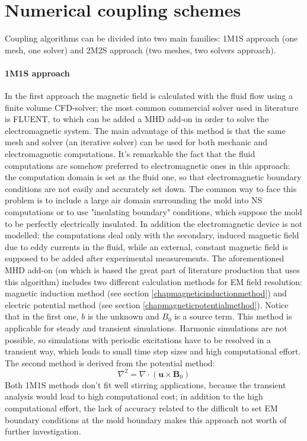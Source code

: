 \section{Numerical coupling schemes}
\label{chapnumericalschemes}
Coupling algorithms can be divided into two main families: 1M1S approach  (one mesh, one solver) and 2M2S approach (two meshes, two solvers approach).\\
\paragraph{1M1S approach}
In the first approach the magnetic field is calculated with the fluid flow using a finite volume CFD-solver; the most common commercial solver used in literature is FLUENT, to which can be added a MHD add-on in order to solve the electromagnetic system. The main advantage of this method is that the same mesh and solver (an iterative solver) can be used for both mechanic and electromagnetic computations. It's remarkable the fact that the fluid computations are somehow preferred to electromagnetic ones in this approach: the computation domain is set as the fluid one, so that electromagnetic boundary conditions are not easily and accurately set down. The common way to face this problem is to include a large air domain surrounding the mold into NS computations or to use  "insulating boundary" conditions, which suppose the mold to be perfectly electrically insulated. In addition the electromagnetic device is not modelled: the computations deal only with the secondary, induced magnetic field due to eddy currents in the fluid, while an external, constant magnetic field is supposed to be added after experimental measurements. The aforementioned MHD add-on (on which is based the great part of literature production that uses this algorithm) includes two different calculation methods for EM field resolution: magnetic induction method (see section \ref{chapmagneticinductionmethod}) and electric potential method (see section \ref{chapmagneticpotentialmethod}). Notice that in the first one, $b$ is the unknown and $B_0$ is a source term. This method is applicable for steady and transient simulations. Harmonic simulations are not possible, so simulations with periodic excitations have to be resolved in a transient way, which leads to small time step sizes and high computational effort. The second method is derived from the potential method:
\begin{equation}
\nabla^2=\nabla \cdot(\textbf{u}\times \textbf{B}_0)
\label{ep1m1s}
\end{equation}
Both 1M1S methods don't fit well stirring applications, because the transient analysis would lead to high computational cost; in addition to the high computational effort, the lack of accuracy related to the difficult to set EM boundary conditions at the mold boundary makes this approach not worth of further investigation.
